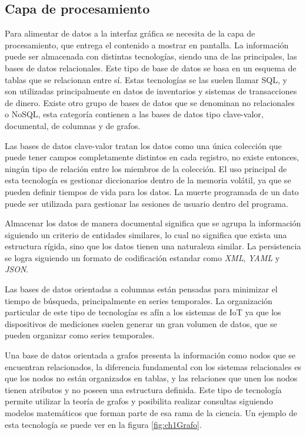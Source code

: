 \newpage

\subsection{Capa de procesamiento}
Para alimentar de datos a la interfaz gráfica se necesita de la capa de procesamiento, que entrega el contenido a mostrar en pantalla. La información puede ser almacenada con distintas tecnologías, siendo una de las principales, las bases de datos relacionales.
Este tipo de base de datos se basa en un esquema de tablas que se relacionan entre sí.
Estas tecnologías se las suelen llamar SQL, y son utilizadas principalmente en datos de inventarios y sistemas de transacciones de dinero.
Existe otro grupo de bases de datos que se denominan no relacionales o NoSQL, esta categoría contienen a las bases de datos tipo clave-valor, documental, de columnas y de grafos.

Las bases de datos clave-valor tratan los datos como una única colección que puede tener campos completamente distintos en cada registro, no existe entonces, ningún tipo de relación entre los miembros de la colección. El uso principal de esta tecnología es gestionar diccionarios dentro de la memoria volátil, ya que se pueden definir tiempos de vida para los datos. La muerte programada de un dato puede ser utilizada para gestionar las sesiones de usuario dentro del programa.

Almacenar los datos de manera documental significa que se agrupa la información siguiendo un criterio de entidades similares, lo cual no significa que exista una estructura rígida, sino que los datos tienen una naturaleza similar.
La persistencia se logra siguiendo un formato de codificación estandar como \emph{XML}, \emph{YAML} y \emph{JSON}.

Las bases de datos orientadas a columnas están pensadas para minimizar el tiempo de búsqueda, principalmente en series temporales.
La organización particular de este tipo de tecnologías es afín a los sistemas de IoT ya que los dispositivos de mediciones suelen generar un gran volumen de datos, que se pueden organizar como series temporales.

Una base de datos orientada a grafos presenta la información como nodos que se encuentran relacionados, la diferencia fundamental con los sistemas relacionales es que los nodos no están organizados en tablas, y las relaciones que unen los nodos tienen atributos y no poseen una estructura definida.
Este tipo de tecnología permite utilizar la teoría de grafos y posibilita realizar consultas siguiendo modelos matemáticos que forman parte de esa rama de la ciencia.
Un ejemplo de esta tecnología se puede ver en la figura \ref{fig:ch1Grafo}.


